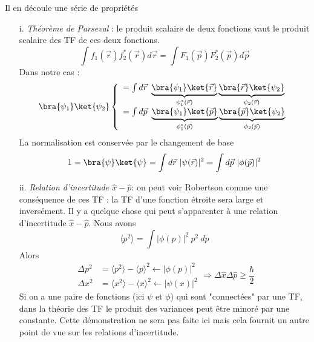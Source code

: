 	
	Il en découle une série de propriétés
	\begin{itemize}
	\item[i.] \textit{Théorème de Parseval }: le produit scalaire de deux fonctions vaut le produit 
	scalaire des TF de ces deux fonctions. 
		\begin{equation}
	\int f_1(\vec{r})f_2^*(\vec{r}) d\vec{r} = \int F_1(\vec{p})F_2^*(\vec{p})d\vec{p}
	\end{equation}
	Dans notre cas :
	\begin{equation}
	\bra{\psi_1}\ket{\psi_2} \left\{\begin{array}{ll}
		= \int d\vec{r}\ \underbrace{\bra{\psi_1}\ket{\vec{r}}}_{\psi_1^*(\vec{r})}
	\underbrace{\bra{\vec{r}}\ket{\psi_2}}_{\psi_2(\vec{r})}\\
	= \int d\vec{p}\ \underbrace{\bra{\psi_1}\ket{\vec{p}}}_{\phi_1^*(\vec{p})}
	\underbrace{\bra{\vec{p}}\ket{\psi_2}}_{\phi_2(\vec{p})}		
	\end{array}\right.
	\end{equation}
		La normalisation est conservée par le changement de base
	\begin{equation}
	1 = \bra{\psi}\ket{\psi} = \int d\vec{r}\ |\psi(\vec{r})|^2 = \int d\vec{p}\ |\phi(\vec{p})|^2
	\end{equation}
	
	\item[ii.] \textit{Relation d'incertitude $\hat{x}-\hat{p}$}: on peut voir Robertson comme une 
	conséquence de ces TF : la TF d'une fonction étroite sera large et inversément. Il y a quelque chose qui peut
	 s'apparenter à une relation d'incertitude $\hat x-\hat p$. Nous avons
	 \begin{equation}
	 \langle p^2\rangle = \int |\phi(p)|^2\ p^2\ dp
	 \end{equation}
	Alors
	\begin{equation}
	\begin{array}{ll}
	\Delta p^2 &= \langle p^2 \rangle-\langle p\rangle^2 \longleftarrow |\phi(p)|^2\\
	\Delta x^2 &= \langle x^2 \rangle-\langle x\rangle^2 \longleftarrow |\psi(x)|^2
	\end{array}\Longrightarrow \Delta \hat x\Delta\hat{p} \geq\frac{\hbar}{2}
	\end{equation}
	Si on a une paire de fonctions (ici $\psi$ et $\phi$) qui sont "connectées" par une TF, dans la 
	théorie des TF le produit des variances peut être minoré par une constante. Cette démonstration
	ne sera pas faite ici mais cela fournit un autre point de vue sur les relations d'incertitude.
		

\end{itemize}
